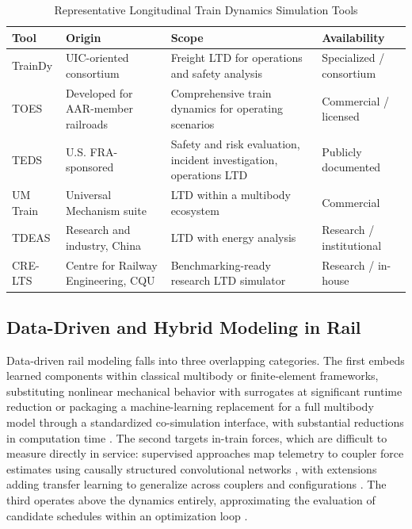 \documentclass[numbered]{trbunofficial}
\begin{document}
\begin{table}[!ht]
  \caption{Representative Longitudinal Train Dynamics Simulation Tools}\label{tab:ltd_tools}
  \begin{center}
  \small
  \begin{tabular}{@{}p{2.1cm}p{3.3cm}p{5.2cm}p{2.6cm}@{}}
    \hline
    Tool & Origin & Scope & Availability \\
    \hline
    TrainDy \citep{Cantone2008TrainDy} & UIC-oriented consortium & Freight LTD for operations and safety analysis & Specialized / consortium \\
    TOES & Developed for AAR-member railroads \citep{WheelRail2018TOES} & Comprehensive train dynamics for operating scenarios & Commercial / licensed \\
    TEDS \citep{FRA2019TEDSProject} & U.S. FRA-sponsored & Safety and risk evaluation, incident investigation, operations LTD & Publicly documented \\
    UM Train \citep{UMTrainPlugin} & Universal Mechanism suite & LTD within a multibody ecosystem & Commercial \\
    TDEAS \citep{Wei2014TDEAS} & Research and industry, China & LTD with energy analysis & Research / institutional \\
    CRE-LTS \citep{Spiryagin2017BenchmarkQuestions} & Centre for Railway Engineering, CQU & Benchmarking-ready research LTD simulator & Research / in-house \\
    \hline
  \end{tabular}
  \end{center}
\end{table}

\subsection{Data-Driven and Hybrid Modeling in Rail}

Data-driven rail modeling falls into three overlapping categories. The first embeds learned components within classical multibody or finite-element frameworks, substituting nonlinear mechanical behavior with surrogates at significant runtime reduction \citep{nie_data_driven_dynamics} or packaging a machine-learning replacement for a full multibody model through a standardized co-simulation interface, with substantial reductions in computation time \citep{zhou_surrogate_integration}. The second targets in-train forces, which are difficult to measure directly in service: supervised approaches map telemetry to coupler force estimates using causally structured convolutional networks \citep{zhang_in_train_forces}, with extensions adding transfer learning to generalize across couplers and configurations \citep{intrainnet}. The third operates above the dynamics entirely, approximating the evaluation of candidate schedules within an optimization loop \citep{liu_rescheduling_surrogate}.
\end{document}
